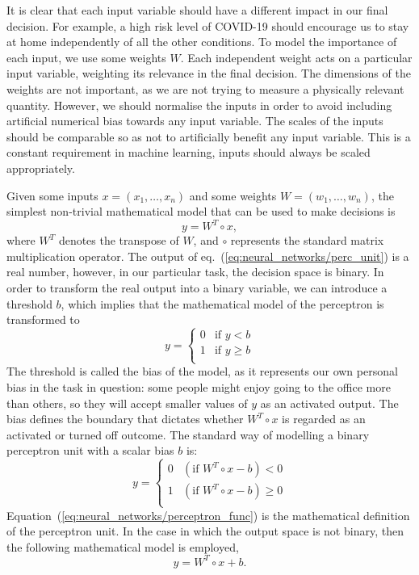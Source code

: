It is clear that each input variable should have a different impact in our final decision. For
example, a high risk level of COVID-19 should encourage us to stay at home independently of all the
other conditions. To model the importance of each input, we use some weights $W$. Each independent
weight acts on a particular input variable, weighting its relevance in the final decision. The
dimensions of the weights are not important, as we are not trying to measure a physically relevant
quantity. However, we should normalise the inputs in order to avoid including artificial numerical
bias towards any input variable. The scales of the inputs should be comparable so as not to
artificially benefit any input variable. This is a constant requirement in machine learning, inputs
should always be scaled appropriately.

Given some inputs $x = (x_1, \dots, x_n)$ and some weights $W = (w_1, \dots, w_n)$, the simplest
non-trivial mathematical model that can be used to make decisions is
\begin{equation}
    y = W^T \circ x,
    \label{eq:neural_networks/perc_unit}
\end{equation}
where $W^T$ denotes the transpose of $W$, and $\circ$ represents the standard matrix multiplication
operator. The output of eq.~(\ref{eq:neural_networks/perc_unit}) is a real number, however, in our
particular task, the decision space is binary. In order to transform the real output into a binary
variable, we can introduce a threshold $b$, which implies that the mathematical model of the
perceptron is transformed to
\begin{equation}
    y = \left\{
	\begin{array}{ll}
		0  & \mbox{if } y < b \\
		1  & \mbox{if } y \geq b \\
	\end{array} \right.\label{eq:neural_networks/threshold}
\end{equation}
The threshold is called the bias of the model, as it represents our own personal bias in the task in
question: some people might enjoy going to the office more than others, so they will accept smaller
values of $y$ as an activated output. The bias defines the boundary that dictates whether $W^T \circ
x$ is regarded as an activated or turned off outcome. The standard way of modelling a binary
perceptron unit with a scalar bias $b$ is:
\begin{equation}
    y = \left\{
        \begin{array}{ll}
            0  & (\mbox{if } W^T \circ x - b) < 0 \\
		    1  & (\mbox{if } W^T \circ x - b) \geq 0 \\
	    \end{array} \right.\label{eq:neural_networks/perceptron_func}
\end{equation}
Equation~(\ref{eq:neural_networks/perceptron_func}) is the mathematical definition of the perceptron
unit. In the case in which the output space is not binary, then the following mathematical model is
employed,
\begin{equation}
    y = W^T \circ x + b.
    \label{eq:neural_networks/perceptron}
\end{equation}

